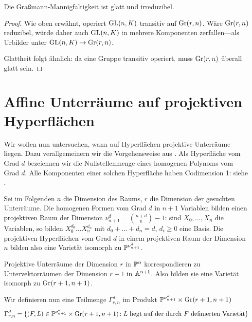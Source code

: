 \begin{prop}
Die Graßmann-Mannigfaltigkeit ist glatt und irreduzibel.
\end{prop}
\begin{proof}
Wie oben erwähnt, operiert $\mathrm{GL}(n,K)$ transitiv auf $\grass r/n$. Wäre $\grass r/n$ reduzibel, würde daher auch $\mathrm{GL}(n,K)$ in mehrere Komponenten zerfallen---als Urbilder unter $\GL nK \to \grass r/n$.

Glattheit folgt ähnlich: da eine Gruppe transitiv operiert, muss $\grass r/n$ überall glatt sein.
\end{proof}

\section{Affine Unterräume auf projektiven Hyperflächen} \label{sec:linesproj}
Wir wollen nun untersuchen, wann auf Hyperflächen projektive Unterräume liegen. Dazu verallgemeinern wir die Vorgehensweise aus \cite[S.~78ff]{Shafarevich}. Als Hyperfläche vom Grad $d$ bezeichnen wir die Nullstellenmenge eines homogenen Polynoms vom Grad $d$. Alle Komponenten einer solchen Hyperfläche haben Codimension 1: siehe \cite[S.~74, Theorem~4]{Shafarevich}.

Sei im Folgenden $n$ die Dimension des Raums, $r$ die Dimension der gesuchten Unterräume. Die homogenen Formen vom Grad $d$ in $n+1$ Variablen bilden einen projektiven Raum der Dimension $\nu_{n+1}^d = \binom{n+d}{n} - 1$: sind $X_0, \dots, X_n$ die Variablen, so bilden $X_0^{d_0} \dots X_n^{d_n}$ mit $d_0 + \dots + d_n = d$, $d_i \geq 0$ eine Basis. Die projektiven Hyperflächen vom Grad $d$ in einem projektiven Raum der Dimension $n$ bilden also eine Varietät isomorph zu $\mathbb P^{\nu_{n+1}^d}$.

Projektive Unterräume der Dimension $r$ in $\mathbb P^{n}$ korrespondieren zu Untervektorräumen der Dimension $r+1$ in $\mathbb A^{n+1}$. Also bilden sie eine Varietät isomorph zu $\grass r+1/{n+1}$.

Wir definieren nun eine Teilmenge $\Gamma_{r,n}^d$ im Produkt $\proj{\nu_{n+1}^d} \times \grass r+1/{n+1}$
\begin{equation}
\Gamma_{r,n}^d = \{(F,L) \in \mathbb P^{\nu_{n+1}^d} \times \grass r+1/{n+1} \colon \text{$L$ liegt auf der durch $F$ definierten Varietät} \}
\end{equation}

